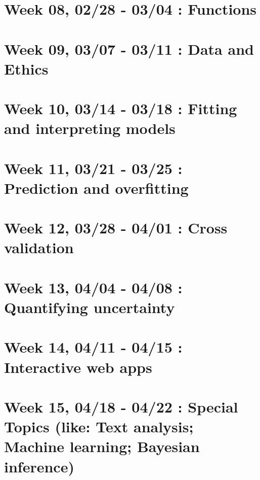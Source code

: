 \hypertarget{week-08-0228---0304-functions}{%
\section{Week 08, 02/28 - 03/04 : Functions}\label{week-08-0228---0304-functions}}

\hypertarget{week-09-0307---0311-data-and-ethics}{%
\section{Week 09, 03/07 - 03/11 : Data and Ethics}\label{week-09-0307---0311-data-and-ethics}}

\hypertarget{week-10-0314---0318-fitting-and-interpreting-models}{%
\section{Week 10, 03/14 - 03/18 : Fitting and interpreting models}\label{week-10-0314---0318-fitting-and-interpreting-models}}

\hypertarget{week-11-0321---0325-prediction-and-overfitting}{%
\section{Week 11, 03/21 - 03/25 : Prediction and overfitting}\label{week-11-0321---0325-prediction-and-overfitting}}

\hypertarget{week-12-0328---0401-cross-validation}{%
\section{Week 12, 03/28 - 04/01 : Cross validation}\label{week-12-0328---0401-cross-validation}}

\hypertarget{week-13-0404---0408-quantifying-uncertainty}{%
\section{Week 13, 04/04 - 04/08 : Quantifying uncertainty}\label{week-13-0404---0408-quantifying-uncertainty}}

\hypertarget{week-14-0411---0415-interactive-web-apps}{%
\section{Week 14, 04/11 - 04/15 : Interactive web apps}\label{week-14-0411---0415-interactive-web-apps}}

\hypertarget{week-15-0418---0422-special-topics-like-text-analysis-machine-learning-bayesian-inference}{%
\section{Week 15, 04/18 - 04/22 : Special Topics (like: Text analysis; Machine learning; Bayesian inference)}\label{week-15-0418---0422-special-topics-like-text-analysis-machine-learning-bayesian-inference}}


